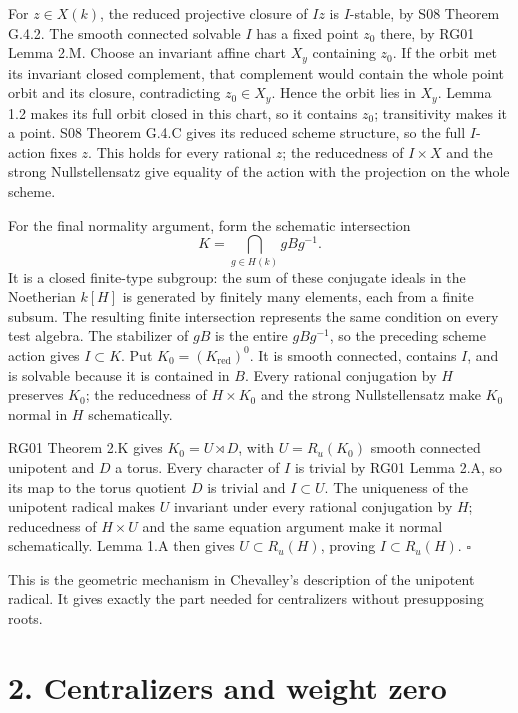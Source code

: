 \documentclass[11pt,a4paper,openany]{report}
\begin{document}
For \(z\in X(k)\), the reduced projective closure of \(Iz\) is \(I\)-stable, by S08 Theorem G.4.2. The smooth connected solvable \(I\) has a fixed point \(z_0\) there, by RG01 Lemma 2.M. Choose an invariant affine chart \(X_y\) containing \(z_0\). If the orbit met its invariant closed complement, that complement would contain the whole point orbit and its closure, contradicting \(z_0\in X_y\). Hence the orbit lies in \(X_y\). Lemma 1.2 makes its full orbit closed in this chart, so it contains \(z_0\); transitivity makes it a point. S08 Theorem G.4.C gives its reduced scheme structure, so the full \(I\)-action fixes \(z\). This holds for every rational \(z\); the reducedness of \(I\times X\) and the strong Nullstellensatz give equality of the action with the projection on the whole scheme.

For the final normality argument, form the schematic intersection \[
 K=\bigcap_{g\in H(k)}gBg^{-1}.
\] It is a closed finite-type subgroup: the sum of these conjugate ideals in the Noetherian \(k[H]\) is generated by finitely many elements, each from a finite subsum. The resulting finite intersection represents the same condition on every test algebra. The stabilizer of \(gB\) is the entire \(gBg^{-1}\), so the preceding scheme action gives \(I\subset K\). Put \(K_0=(K_{\mathrm{red}})^0\). It is smooth connected, contains \(I\), and is solvable because it is contained in \(B\). Every rational conjugation by \(H\) preserves \(K_0\); the reducedness of \(H\times K_0\) and the strong Nullstellensatz make \(K_0\) normal in \(H\) schematically.

RG01 Theorem 2.K gives \(K_0=U\rtimes D\), with \(U=R_u(K_0)\) smooth connected unipotent and \(D\) a torus. Every character of \(I\) is trivial by RG01 Lemma 2.A, so its map to the torus quotient \(D\) is trivial and \(I\subset U\). The uniqueness of the unipotent radical makes \(U\) invariant under every rational conjugation by \(H\); reducedness of \(H\times U\) and the same equation argument make it normal schematically. Lemma 1.A then gives \(U\subset R_u(H)\), proving \(I\subset R_u(H)\). \(\square\)

This is the geometric mechanism in Chevalley's description of the unipotent radical. It gives exactly the part needed for centralizers without presupposing roots.

\section{2. Centralizers and weight zero}\label{AG-RG-02-centralizers-and-weight-zero}
\end{document}
